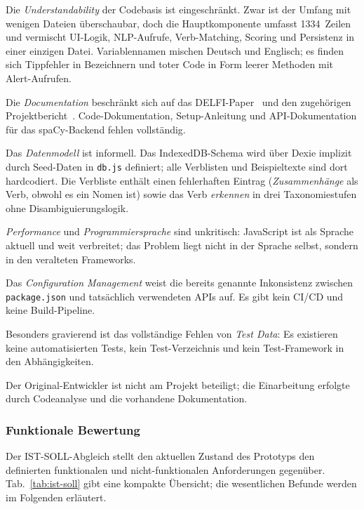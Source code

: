 Die \emph{Understandability} der Codebasis ist eingeschränkt.
Zwar ist der Umfang mit wenigen Dateien überschaubar, doch die Hauptkomponente umfasst 1334~Zeilen und vermischt UI-Logik, NLP-Aufrufe, Verb-Matching, Scoring und Persistenz in einer einzigen Datei.
Variablennamen mischen Deutsch und Englisch; es finden sich Tippfehler in Bezeichnern und toter Code in Form leerer Methoden mit Alert-Aufrufen.

Die \emph{Documentation} beschränkt sich auf das DELFI-Paper~\cite{loth2022kompetenzeditor} und den zugehörigen Projektbericht~\cite{loth2022masterprojekt}.
Code-Dokumentation, Setup-Anleitung und API-Dokumentation für das spaCy-Backend fehlen vollständig.

Das \emph{Datenmodell} ist informell.
Das IndexedDB-Schema wird über Dexie implizit durch Seed-Daten in \texttt{db.js} definiert; alle Verblisten und Beispieltexte sind dort hardcodiert.
Die Verbliste enthält einen fehlerhaften Eintrag (\emph{Zusammenhänge} als Verb, obwohl es ein Nomen ist) sowie das Verb \emph{erkennen} in drei Taxonomiestufen ohne Disambiguierungslogik.

\emph{Performance} und \emph{Programmiersprache} sind unkritisch: JavaScript ist als Sprache aktuell und weit verbreitet; das Problem liegt nicht in der Sprache selbst, sondern in den veralteten Frameworks.

Das \emph{Configuration Management} weist die bereits genannte Inkonsistenz zwischen \texttt{package.json} und tatsächlich verwendeten APIs auf.
Es gibt kein CI/CD und keine Build-Pipeline.

Besonders gravierend ist das vollständige Fehlen von \emph{Test Data}: Es existieren keine automatisierten Tests, kein Test-Verzeichnis und kein Test-Framework in den Abhängigkeiten.

Der Original-Entwickler ist nicht am Projekt beteiligt; die Einarbeitung erfolgte durch Codeanalyse und die vorhandene Dokumentation.

\subsubsection{Funktionale Bewertung}\label{sec:funktionale-bewertung}

Der IST-SOLL-Abgleich stellt den aktuellen Zustand des Prototyps den definierten funktionalen und nicht-funktionalen Anforderungen gegenüber.
Tab.~\ref{tab:ist-soll} gibt eine kompakte Übersicht; die wesentlichen Befunde werden im Folgenden erläutert.

